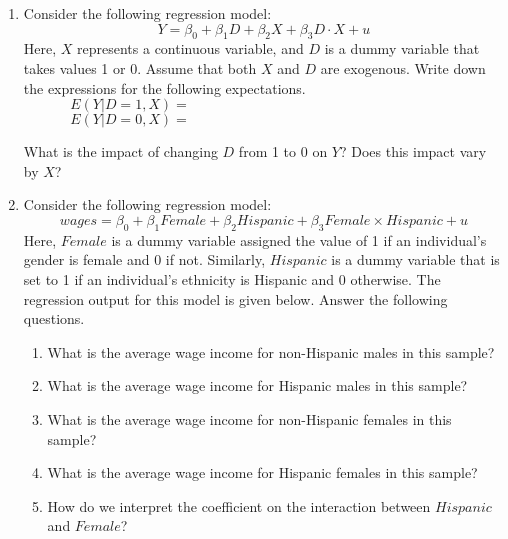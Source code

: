 \documentclass{./../../Latex/handout}
\begin{document}
\thispagestyle{plain}
\vspace{-1em}

\begin{enumerate}
\item Consider the following regression model:
$$ Y = \beta_0 + \beta_1 D + \beta_2 X + \beta_3  D\cdot X + u $$
Here, \( X \) represents a continuous variable, and \( D \) is a dummy variable that takes values 1 or 0. Assume that both $X$ and $D$ are exogenous. Write down the expressions for the following expectations.
$$ E(Y|D=1, X) =  \hspace{8cm} $$
$$ E(Y|D=0, X) = \hspace{8cm}  $$ 

What is the impact of changing $D$ from 1 to 0 on $Y$? Does this impact vary by $X$?

\vspace{3cm}
\item Consider the following regression model:$$ wages = \beta_0 + \beta_1 Female + \beta_2 Hispanic + \beta_3 Female \times Hispanic +  u  $$
Here, \(Female\) is a dummy variable assigned the value of 1 if an individual's gender is female and 0 if not. Similarly, \(Hispanic\) is a dummy variable that is set to 1 if an individual's ethnicity is Hispanic and 0 otherwise. The regression output for this model is given below. Answer the following questions.

\begin{table}
\centering
		
\end{table}

\newpage
\begin{enumerate}
	\item What is the average wage income for non-Hispanic males in this sample?
	\vspace{2cm}
	\item What is the average wage income for Hispanic males in this sample? \vspace{2cm}
	 \item What is the average wage income for non-Hispanic females in this sample?\vspace{2cm}
	\item What is the average wage income for Hispanic females in this sample? \vspace{2cm}
	\item How do we interpret the coefficient on the interaction between $Hispanic$ and $Female$?
\end{enumerate}
\end{enumerate}
\end{document}
